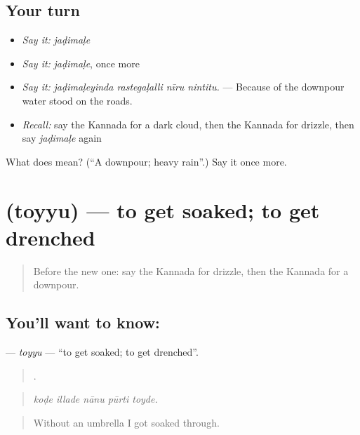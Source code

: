 \subsection*{Your turn}
\begin{itemize}
\raggedright
  \item \emph{Say it:} \emph{jaḍimaḷe}
  \item \emph{Say it:} \emph{jaḍimaḷe}, once more
  \item \emph{Say it:} \emph{jaḍimaḷeyinda rastegaḷalli nīru nintitu.} — Because of the downpour water stood on the roads.
  \item \emph{Recall:} say the Kannada for a dark cloud, then the Kannada for drizzle, then say \emph{jaḍimaḷe} again
\end{itemize}

\begin{tcolorbox}[breakable,colback=teal!4,colframe=teal!35!black,title={Before you move on}]
What does  mean? (\textquotedblleft{}A downpour; heavy rain\textquotedblright{}.) Say it once more.
\end{tcolorbox}
\section[\texorpdfstring{\kn{ತೊಯ್ಯು} (toyyu)}{ತೊಯ್ಯು (toyyu)}]{ (toyyu) — to get soaked; to get drenched}

\label{lesson:KA-C485-toyyu}



\begin{quote}
Before the new one: say the Kannada for drizzle, then the Kannada for a downpour.
\end{quote}

\subsection*{You'll want to know: }
\textbf{} — \emph{toyyu} — \textquotedblleft{}to get soaked; to get drenched\textquotedblright{}.

\begin{quote}
    .
\end{quote}

\begin{quote}
\emph{koḍe illade nānu pūrti toyde.}
\end{quote}

\begin{quote}
Without an umbrella I got soaked through.
\end{quote}

